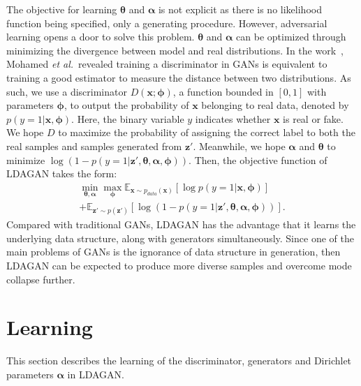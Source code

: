\documentclass{article}
\def\etal{\emph{et al.}}
\begin{document}
The objective for learning $\bm{\theta}$ and $\bm{\alpha}$ is not explicit as there is no likelihood function being specified, only a generating procedure.
However, adversarial learning opens a door to solve this problem.
$\bm{\theta}$ and $\bm{\alpha}$ can be optimized through minimizing the divergence between model and real distributions.
In the work~\cite{mohamed2017learning}, Mohamed \etal~revealed training a discriminator in GANs is equivalent to training a good estimator to measure the distance between two distributions.
As such, we use a discriminator $D\left(\mathbf{x}; \bm{\phi}\right)$, a function bounded in $\left[0,1\right]$ with parameters $\bm{\phi}$, to output the probability of $\mathbf{x}$ belonging to real data, denoted by $p\left(y=1|\mathbf{x},\bm{\phi}\right)$.
Here, the binary variable $y$ indicates whether $\mathbf{x}$ is real or fake.
We hope $D$ to maximize the probability of assigning the correct label to both the real samples and samples generated from $\mathbf{z}'$.
Meanwhile, we hope $\bm{\alpha}$ and $\bm{\theta}$ to minimize $\log \left( 1-p\left( y=1 | \mathbf{z}',\bm{\theta},\bm{\alpha},\bm{\phi} \right)\right)$.
Then, the objective function of LDAGAN takes the form:
\begin{multline}
\min_{\bm{\theta}, \bm{\alpha}}
\max_{\bm{\phi}}
\mathbb{E}_{\mathbf{x} \sim p_{data}\left(\mathbf{x}\right)}
\left[ \log p\left( y=1 | \mathbf{x}, \bm{\phi} \right) \right]\\
+\mathbb{E}_{\mathbf{z}' \sim p\left(\mathbf{z}'\right)}
\left[ \log \left( 1-p\left( y=1 | \mathbf{z}',\bm{\theta},\bm{\alpha},\bm{\phi} \right)\right) \right].
\label{eq:LDAGAN3}
\end{multline}
\noindent Compared with traditional GANs, LDAGAN has the advantage that it learns the underlying data structure, along with generators simultaneously.
Since one of the main problems of GANs is the ignorance of data structure in generation, then LDAGAN can be expected to produce more diverse samples and overcome mode collapse further.


\section{Learning}
\label{sec:Learning}

This section describes the learning of the discriminator, generators and Dirichlet parameters $\bm{\alpha}$ in LDAGAN.
\end{document}
